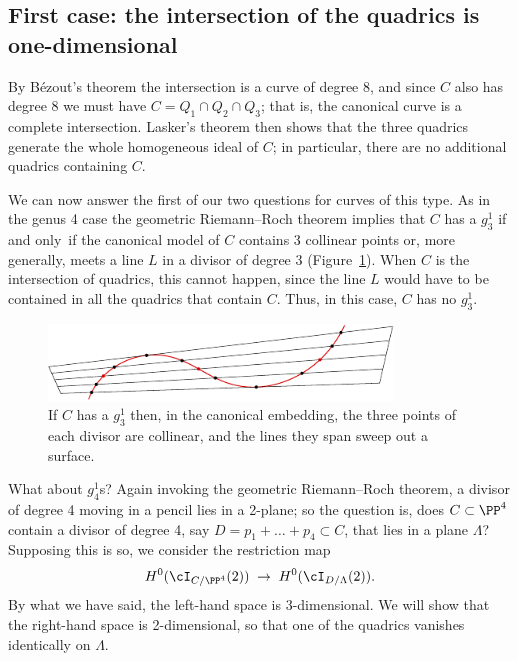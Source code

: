\subsection*{First case: the intersection of the quadrics is one-dimensional}
  By
B\'ezout's theorem
%
the intersection is a curve of
degree 8, and since $C$ also has degree 8 we must have
$C=Q_1 \cap Q_2 \cap Q_3$; that is, the canonical curve is a
complete intersection.
%
Lasker's theorem
%
then shows that the three quadrics
generate the
whole homogeneous ideal of $C$; in particular, there are no additional
quadrics containing $C$.

We can now answer the first of our two questions for curves of this
type. As in the genus 4 case the geometric Riemann--Roch theorem
%
implies that $C$ has a $g^1_3$ if and only~if the canonical model of
$C$ contains 3 collinear points or, more generally, meets a line $L$
in a divisor of degree 3 (Figure~\ref{3 collinear points from g13}).
When $C$ is the intersection of quadrics, this cannot happen, since
the line $L$ would have to be contained in all the quadrics that
contain $C$. Thus, in this case,
$C$ has no $g^1_3$.

\begin{figure}
\centerline {\includegraphics[width=3.6in]{"main/Fig08-5"}}
\caption{If $C$ has a $g^{1}_{3}$ then, in the canonical embedding, the three
points
of each divisor are collinear, and the lines they span sweep out a surface.
}
\label{3 collinear points from g13}
\end{figure}


What about $g^1_4$s? Again invoking the geometric Riemann--Roch
%
theorem, a divisor of degree 4 moving in a pencil lies in a 2-plane;
so the question is, does $C \subset \PP^4$ contain a divisor of degree
4, say $D = p_1+\dots +p_4 \subset C$, that lies in a plane $\Lambda$?
Supposing this is so, we consider the restriction map
$$
H^0(\cI_{C/\PP^4}(2)) \; \to \; H^0(\cI_{D/\Lambda}(2)).
$$
By what we have said, the left-hand space is 3-dimensional.
We will show that the right-hand space
is 2-dimensional, so that one of the quadrics vanishes identically on $\Lambda$.

